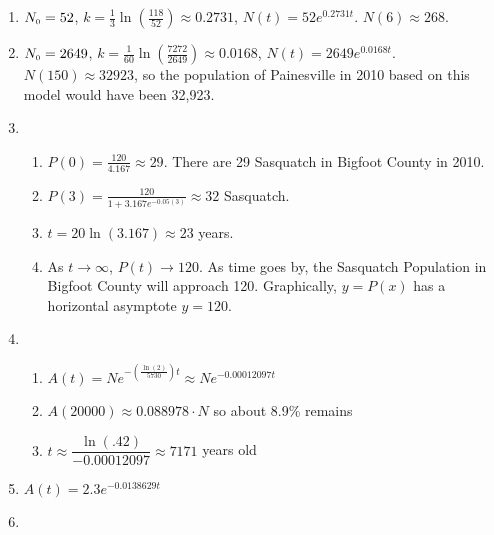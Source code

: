 \begin{enumerate}
\setcounter{enumi}{\value{HW}}


\item  $N_{\text{\tiny $0$}} = 52$,  $k = \frac{1}{3} \ln\left( \frac{118}{52}\right) \approx 0.2731$, $N(t) = 52e^{0.2731t}$.  $N(6) \approx 268$. 

\item  $N_{\text{\tiny $0$}} = 2649$,  $k = \frac{1}{60} \ln\left( \frac{7272}{2649}\right) \approx 0.0168$, $N(t) = 2649e^{0.0168t}$.  $N(150) \approx 32923$, so the population of Painesville in 2010 based on this model would have been 32,923.



\item  \begin{enumerate}  \item  $P(0) = \frac{120}{4.167} \approx 29$.  There are 29 Sasquatch in Bigfoot County in 2010.

\item  $P(3) = \frac{120}{1+3.167e^{-0.05(3)}} \approx 32$ Sasquatch.

\item  $t = 20 \ln(3.167) \approx 23$ years.

\item  As $t \rightarrow \infty$, $P(t) \rightarrow 120$.  As time goes by, the Sasquatch Population in Bigfoot County will approach 120.  Graphically,  $y = P(x)$ has a horizontal asymptote $y=120$.

\end{enumerate}


\item \begin{enumerate}

\item $A(t) = Ne^{-\left(\frac{\ln(2)}{5730}\right)t} \approx Ne^{-0.00012097t}$
\item $A(20000) \approx 0.088978 \cdot N$ so about 8.9\% remains
\item $t \approx \dfrac{\ln(.42)}{-0.00012097} \approx 7171$ years old

\end{enumerate}

\item $A(t) = 2.3e^{-0.0138629t}$

\pagebreak

\addtocounter{enumi}{1}

\item \begin{enumerate}


\end{enumerate}
\end{enumerate}
